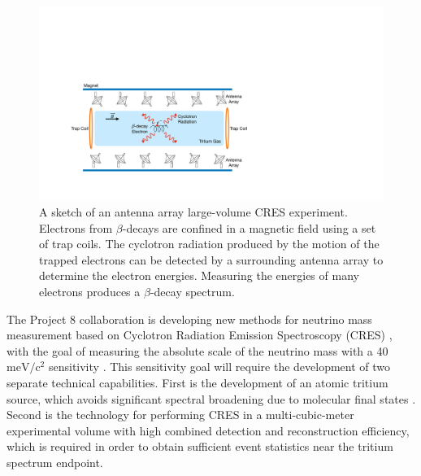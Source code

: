 \begin{figure}[htbp]
\centering
\includegraphics[width=.6\textwidth]{figs/Chapter-5/220914_fscd_cartoon.pdf}
\qquad
\caption{\label{fig:fscd-cartoon} A sketch of an antenna array large-volume CRES experiment. Electrons from $\beta$-decays are confined in a magnetic field using a set of trap coils. The cyclotron radiation produced by the motion of the trapped electrons can be detected by a surrounding antenna array to determine the electron energies. Measuring the energies of many electrons produces a $\beta$-decay spectrum.}
\end{figure}

The Project 8 collaboration is developing new methods for neutrino mass measurement based on Cyclotron Radiation Emission Spectroscopy (CRES) \cite{Monreal:2009za, Project8:2014ivu, Project8:2017nal, Project8:2022wqh}, with the goal of measuring the absolute scale of the neutrino mass with a 40 $\textrm{meV}/\textrm{c}^2$ sensitivity \cite{p8bayesian, FORMAGGIO20211}. This sensitivity goal will require the development of two separate technical capabilities. First is the development of an atomic tritium source, which avoids significant spectral broadening due to molecular final states \cite{Bodine:2015sma}. Second is the technology for performing CRES in a multi-cubic-meter experimental volume with high combined detection and reconstruction efficiency, which is required in order to obtain sufficient event statistics near the tritium spectrum endpoint.

